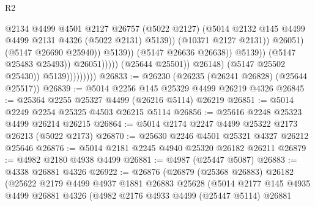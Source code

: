\begin{lexlean}{R2}
\begin{coremodule}
                                                          @2134
                                                          @4499
                                                          @4501
                                                          @2127
                                                          @26757
                                                          (@5022 @2127)
                                                          (@5014
                                                            @2132
                                                            @145
                                                            @4499
                                                            @4499
                                                            @2131
                                                            @4326
                                                            (@5022 @2131)
                                                            @5139))
                                                        (@10371 @2127 @2131))
                                                      @26051)
                                                    (@5147 @26690 @25940))
                                                  @5139))
                                              (@5147 @26636 @26638))
                                            @5139))
                                        (@5147 @25483 @25493))
                                      @26051)))))
                            (@25644 @25501))
                          @26148)
                        (@5147 @25502 @25430))
                      @5139)))))))))
@26833 := @26230 (@26235 (@26241 @26828) (@25644 @25517))
@26839 := @5014 @2256 @145 @25329 @4499 @26219 @4326
@26845 := @25364 @2255 @25327 @4499 (@26216 @5114) @26219
@26851 := @5014 @2249 @2254 @25325 @4503 @26215 @5114
@26856 := @25616 @2248 @25323 @4499 @26214 @26215
@26864 := @5014 @2174 @2247 @4499 @25322 @2173 @26213 (@5022 @2173)
@26870 := @25630 @2246 @4501 @25321 @4327 @26212 @25646
@26876 := @5014 @2181 @2245 @4940 @25320 @26182 @26211
@26879 := @4982 @2180 @4938 @4499
@26881 := @4987 (@25447 @5087)
@26883 := @4338 @26881 @4326
@26922 := @26876
    (@26879
      (@25368 @26883)
      @26182
      (@25622
        @2179
        @4499
        @4937
        @1881
        @26883
        @25628
        (@5014
          @2177
          @145
          @4935
          @4499
          @26881
          @4326
          (@4982
            @2176
            @4933
            @4499
            (@25447 @5114)
            @26881

\end{coremodule}
\end{lexlean}
